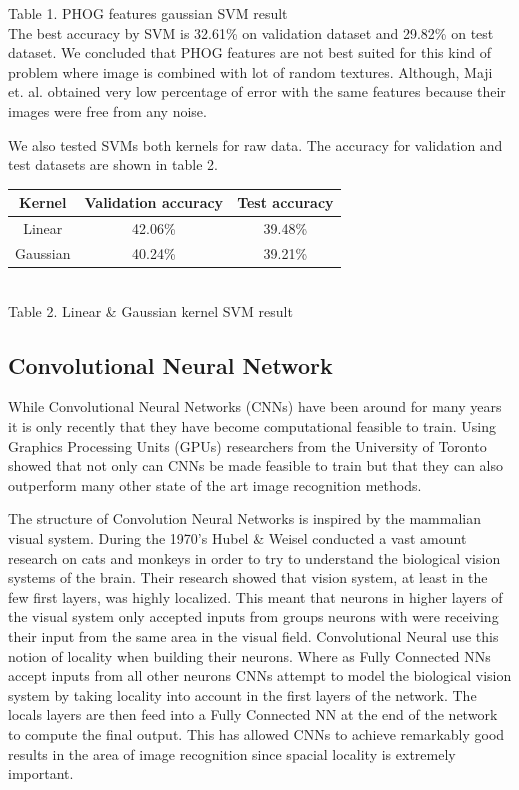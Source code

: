 \documentclass[10pt,twocolumn]{article}
\begin{document}
Table 1. PHOG features gaussian SVM result
\\

The best accuracy by SVM is 32.61\% on validation dataset and 29.82\% on test dataset. We concluded that PHOG features are not best suited for this kind of problem where image is combined with lot of random textures. Although, Maji et. al. obtained very low percentage of error with the same features because their images were free from any noise.

We also tested SVMs both kernels for raw data. The accuracy for validation and test datasets are shown in table 2.
\\

\begin{tabular}{|c|c|c|}
\hline
Kernel & Validation accuracy & Test accuracy \\ \hline
Linear & 42.06\% & 39.48\% \\
Gaussian & 40.24\% & 39.21\% \\
\hline
\end{tabular}
\\

Table 2. Linear \& Gaussian kernel SVM result
\\

\subsection{Convolutional Neural Network}
While Convolutional Neural Networks (CNNs) have been around for many years it is only recently that they have become computational feasible to train. Using Graphics Processing Units (GPUs) researchers from the University of Toronto showed that not only can CNNs be made feasible to train but that they can also outperform many other state of the art image recognition methods\cite{imagenet}.

The structure of Convolution Neural Networks is inspired by the mammalian visual system. During the 1970's Hubel \& Weisel conducted a vast amount research on cats and monkeys in order to try to understand the biological vision systems of the brain\cite{hubel}. Their research showed that vision system, at least in the few first layers, was highly localized. This meant that neurons in higher layers of the visual system only accepted inputs from groups neurons with were receiving their input from the same area in the visual field. Convolutional Neural use this notion of locality when building their neurons. Where as Fully Connected NNs accept inputs from all other neurons CNNs attempt to model the biological vision system by taking locality into account in the first layers of the network. The locals layers are then feed into a Fully Connected NN at the end of the network to compute the final output. This has allowed CNNs to achieve remarkably good results in the area of image recognition since spacial locality is extremely important.
\end{document}
